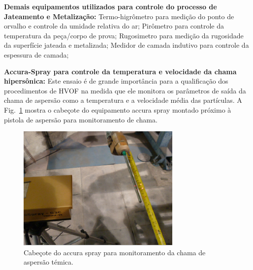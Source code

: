 \textbf{Demais equipamentos utilizados para controle do processo de
Jateamento e Metalização:}
Termo-higrômetro para medição do ponto de orvalho e controle da umidade relativa do ar;
Pirômetro para controle da temperatura da peça/corpo de prova;
Rugosimetro para medição da rugosidade da superfície jateada e metalizada;
Medidor de camada indutivo para controle da espessura de camada;

\textbf{Accura-Spray para controle da temperatura e velocidade da chama
hipersônica:} Este ensaio é de grande importância para a qualificação dos
procedimentos de HVOF na medida que ele monitora os parâmetros de saída da chama de aspersão
como a temperatura e a velocidade média das partículas. A
Fig.~\ref{fig:proj_hvof_6} mostra o cabeçote do equipamento accura spray
montado próximo à pistola de aspersão para monitoramento de chama.

\begin{figure}
	\centering
	\includegraphics[width=1\columnwidth]{sota/figs/projeto/proj_hvof_6.png}
    \caption{Cabeçote do accura spray para monitoramento da chama de aspersão
    témica.}
    \label{fig:proj_hvof_6}
\end{figure}